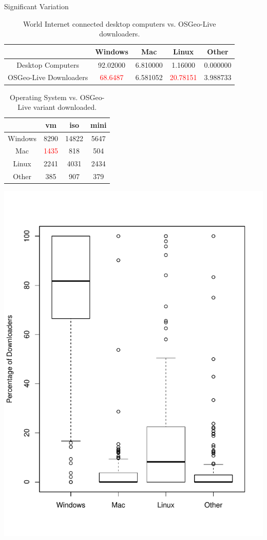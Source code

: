 \documentclass{beamer}
\begin{document}
\begin{frame}{Significant Variation}
\centering
\begin{tiny}
\vspace{-.1in}
\begin{table}
\caption{\tiny World Internet connected desktop computers vs. OSGeo-Live downloaders.}
\vspace{-.1in}
	\begin{tabular}{c | c c c c }
 		& Windows & Mac & Linux & Other \\ \hline
		Desktop Computers & 92.02000 & 6.810000 & 1.16000 & 0.000000 \\ 
		OSGeo-Live Downloaders & \textcolor{red}{68.6487} & 6.581052 & \textcolor{red}{20.78151} & 3.988733
	\end{tabular}
\end{table}
\vspace{-.2in}
\begin{table}
\caption{\tiny Operating System vs. OSGeo-Live variant downloaded.}
\vspace{-.1in}
	\begin{tabular}{c | c c c }
		& vm & iso & mini	\\	\hline
		Windows& 8290 & 14822 & 5647 \\
		Mac& \textcolor{red}{1435} & 818 & 504 \\
		Linux& 2241 & 4031 & 2434 \\
		Other& 385 & 907 & 379 \\
	\end{tabular}
\end{table}

\end{tiny}
\vspace{-.3in}

\begin{center}
\includegraphics[width=.4\textwidth]{CountryOSVariation.pdf}
\end{center}

\end{frame}
\end{document}
